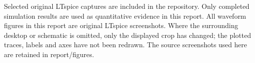 \documentclass[11pt,a4paper]{article}
\begin{document}
Selected original LTspice captures are included in the repository. Only completed simulation results are used as quantitative evidence in this report. All waveform figures in this report are original LTspice screenshots. Where the surrounding desktop or schematic is omitted, only the displayed crop has changed; the plotted traces, labels and axes have not been redrawn. The source screenshots used here are retained in report/figures.
\end{document}
